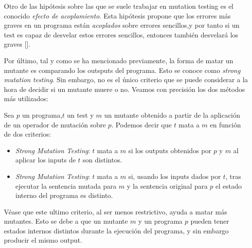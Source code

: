 Otro de las hipótesis sobre las que se suele trabajar en mutation testing es el conocido \textit{efecto de acoplamiento}. Esta hipótesis propone que los errores más graves en un programa están \textit{acoplados} sobre errores sencillos,y por tanto si un test es capaz de desvelar estos errores sencillos, entonces también desvelará los graves [\cite{offutt1992investigations}].

Por último, tal y como se ha mencionado previamente, la forma de matar un mutante es comparando los outsputs del programa. Esto se conoce como \textit{strong mutation testing}. Sin embargo, no es el único criterio que se puede considerar a la hora de decidir si un mutante muere o no. Veamos con precisión los dos métodos más utilizados:

\begin{definition}
\label{def:def24}
Sea $p$ un programa,$t$ un test y $m$ un mutante obtenido a partir de la aplicación de un operador de mutación sobre $p$. Podemos decir que $t$ mata a $m$ en función de dos criterios:
\begin{itemize}
\item \emph{Strong Mutation Testing}: $t$ mata a $m$ si los outputs obtenidos por $p$ y $m$ al aplicar los inputs de $t$ son distintos.
\item \emph{Strong Mutation Testing}: $t$ mata a $m$ si, usando los inputs dados por $t$,  tras ejecutar la sentencia mutada para $m$ y la sentencia original para $p$ el estado interno del programa es distinto. 
\end{itemize}
\end{definition}

Véase que este ultimo criterio, al ser menos restrictivo, ayuda a matar más mutantes. Esto se debe a que un mutante $m$ y un programa $p$ pueden tener estados internos distintos durante la ejecución del programa, y sin embargo producir el mismo output. 

